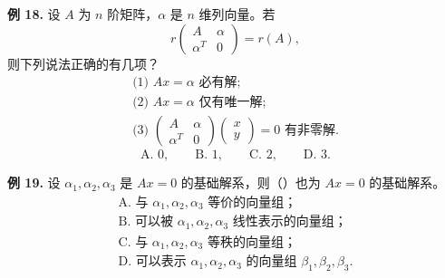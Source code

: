 \begin{problemblock}
\textbf{例 18.} 设 \(A\) 为 \(n\) 阶矩阵，\(\alpha\) 是 \(n\) 维列向量。若
\[
r\begin{pmatrix}A&\alpha\\\alpha^T&0\end{pmatrix}=r(A),
\]
则下列说法正确的有几项？
\[
\begin{array}{l}
\text{(1) }Ax=\alpha\text{ 必有解};\\
\text{(2) }Ax=\alpha\text{ 仅有唯一解};\\
\text{(3) }\begin{pmatrix}A&\alpha\\\alpha^T&0\end{pmatrix}
\begin{pmatrix}x\\y\end{pmatrix}=0\text{ 有非零解}.
\end{array}
\]
\[
\text{A. }0,\qquad \text{B. }1,\qquad \text{C. }2,\qquad \text{D. }3.
\]
\end{problemblock}
\begin{solutionblock}
\end{solutionblock}

\begin{problemblock}
\textbf{例 19.} 设 \(\alpha_1,\alpha_2,\alpha_3\) 是 \(Ax=0\) 的基础解系，则（\quad）也为 \(Ax=0\) 的基础解系。
\[
\begin{array}{l}
\text{A. 与 }\alpha_1,\alpha_2,\alpha_3\text{ 等价的向量组；}\\
\text{B. 可以被 }\alpha_1,\alpha_2,\alpha_3\text{ 线性表示的向量组；}\\
\text{C. 与 }\alpha_1,\alpha_2,\alpha_3\text{ 等秩的向量组；}\\
\text{D. 可以表示 }\alpha_1,\alpha_2,\alpha_3\text{ 的向量组 }\beta_1,\beta_2,\beta_3.
\end{array}
\]
\end{problemblock}
\begin{solutionblock}
\end{solutionblock}

